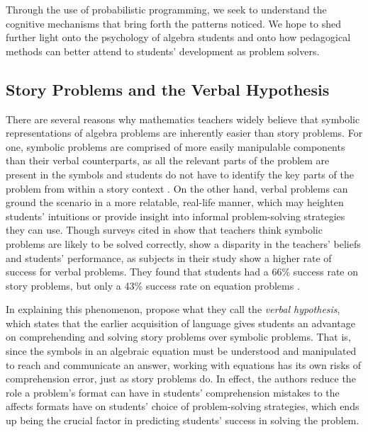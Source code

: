 \documentclass[10pt,letterpaper]{article}
\begin{document}
	Through the use of probabilistic programming, we seek to understand the cognitive mechanisms that bring forth the patterns  noticed. We hope to shed further light onto the psychology of algebra students and onto how pedagogical methods can better attend to students' development as problem solvers.
	
	
	\subsection{Story Problems and the Verbal Hypothesis}
	
	There are several reasons why mathematics teachers widely believe that symbolic representations of algebra problems are inherently easier than story problems. For one, symbolic problems are comprised of more easily manipulable components than their verbal counterparts, as all the relevant parts of the problem are present in the symbols and students do not have to identify the key parts of the problem from within a story context \cite{KoedNath2004}. On the other hand, verbal problems can ground the scenario in a more relatable, real-life manner, which may heighten students’ intuitions or provide insight into informal problem-solving strategies they can use. Though surveys cited in \cite{Nathan2012} show that teachers think symbolic problems are likely to be solved correctly,  show a disparity in the teachers' beliefs and students' performance, as subjects in their study show a higher rate of success for verbal problems. They found that students had a 66\% success rate on story problems, but only a 43\% success rate on equation problems \cite{KoedNath2004}.
	
	In explaining this phenomenon,  propose what they call the \textit{verbal hypothesis}, which states that the earlier acquisition of language gives students an advantage on comprehending and solving story problems over symbolic problems. That is, since the symbols in an algebraic equation must be understood and manipulated to reach and communicate an answer, working with equations has its own risks of comprehension error, just as story problems do. In effect, the authors reduce the role a problem's format can have in students' comprehension mistakes to the affects formats have on students' choice of problem-solving strategies, which ends up being the crucial factor in predicting students' success in solving the problem.
	
\end{document}
